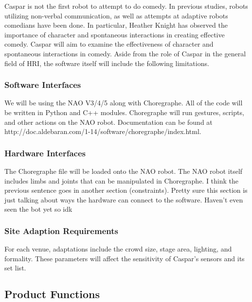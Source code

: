 \documentclass[onecolumn, draftclsnofoot,10pt, compsoc]{IEEEtran}
\begin{document}
Caspar is not the first robot to attempt to do comedy. In previous studies, robots utilizing non-verbal communication, as well as attempts at adaptive robots comedians have been done. In particular, Heather Knight has observed the importance of character and spontaneous interactions in creating effective comedy. Caspar will aim to examine the effectiveness of character and spontaneous interactions in comedy. Aside from the role of Caspar in the general field of HRI, the software itself will include the following limitations.

\subsubsection{Software Interfaces}
We will be using the NAO V3/4/5 along with Choregraphe. All of the code will be written in Python and C++ modules. Choregraphe will run gestures, scripts, and other actions on the NAO robot. Documentation can be found at http://doc.aldebaran.com/1-14/software/choregraphe/index.html.
\subsubsection{Hardware Interfaces}
The Choregraphe file will be loaded onto the NAO robot. The NAO robot itself includes limbs and joints that can be manipulated in Choregraphe. I think the previous sentence goes in another section (constraints). Pretty sure this section is just talking about ways the hardware can connect to the software. Haven’t even seen the bot yet so idk

\subsubsection{Site Adaption Requirements}
For each venue, adaptations include the crowd size, stage area, lighting, and formality. These parameters will affect the sensitivity of Caspar's sensors and its set list.

\subsection{Product Functions}
\end{document}
